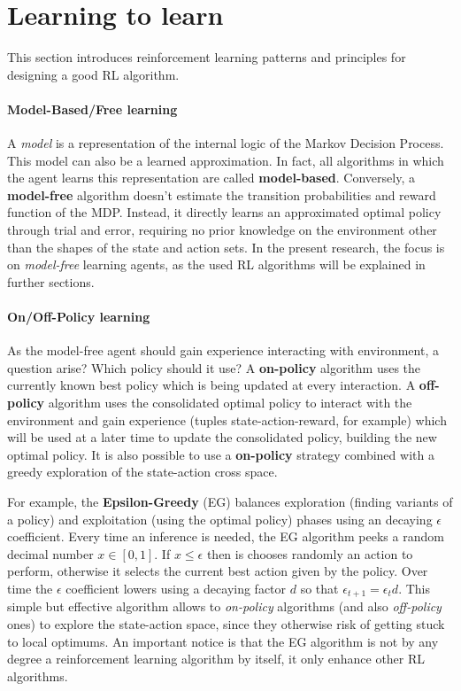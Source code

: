 \section{Learning to learn}

This section introduces reinforcement learning patterns and principles for designing a good RL algorithm.

\paragraph{Model-Based/Free learning}

A \textit{model} is a representation of the internal logic of the Markov Decision Process. This model can also be a learned approximation. In fact, all algorithms in which the agent learns this representation are called \textbf{model-based}. Conversely, a \textbf{model-free} algorithm doesn't estimate the transition probabilities and reward function of the MDP. Instead, it directly learns an approximated optimal policy through trial and error, requiring no prior knowledge on the environment other than the shapes of the state and action sets.
In the present research, the focus is on \textit{model-free} learning agents, as the used RL algorithms will be explained in further sections.

\paragraph{On/Off-Policy learning}

As the model-free agent should gain experience interacting with environment, a question arise? Which policy should it use? A \textbf{on-policy} algorithm uses the currently known best policy which is being updated at every interaction. A \textbf{off-policy} algorithm uses the consolidated optimal policy to interact with the environment and gain experience (tuples state-action-reward, for example) which will be used at a later time to update the consolidated policy, building the new optimal policy. It is also possible to use a \textbf{on-policy} strategy combined with a greedy exploration of the state-action cross space.

For example, the \textbf{Epsilon-Greedy} (EG) \cite{liu2021improving} balances exploration (finding variants of a policy) and exploitation (using the optimal policy) phases using an decaying $\epsilon$ coefficient.
Every time an inference is needed, the EG algorithm peeks a random decimal number $x \in [0, 1]$. If $x \leq \epsilon$ then is chooses randomly an action to perform, otherwise it selects the current best action given by the policy.
Over time the $\epsilon$ coefficient lowers using a decaying factor $d$ so that $\epsilon_{t + 1} = \epsilon_{t} d$. This simple but effective algorithm allows to \textit{on-policy} algorithms (and also \textit{off-policy} ones) to explore the state-action space, since they otherwise risk of getting stuck to local optimums.
An important notice is that the EG algorithm is not by any degree a reinforcement learning algorithm by itself, it only enhance other RL algorithms.

